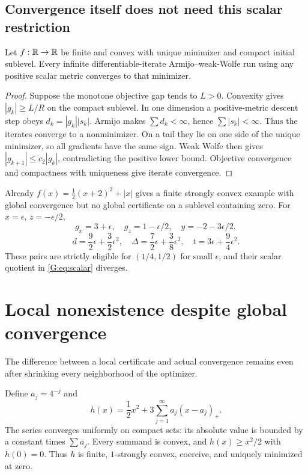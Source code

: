 

\subsection{Convergence itself does not need this scalar restriction}

\begin{proposition}\label{G:prop:scalarconv}
Let $f:\mathbb R\to\mathbb R$ be finite and convex with unique minimizer and compact initial sublevel. Every infinite differentiable-iterate Armijo--weak-Wolfe run using any positive scalar metric converges to that minimizer.
\end{proposition}
\begin{proof}
Suppose the monotone objective gap tends to $L>0$. Convexity gives $|g_k|\ge L/R$ on the compact sublevel. In one dimension a positive-metric descent step obeys $d_k=|g_k||s_k|$. Armijo makes $\sum d_k<\infty$, hence $\sum|s_k|<\infty$. Thus the iterates converge to a nonminimizer. On a tail they lie on one side of the unique minimizer, so all gradients have the same sign. Weak Wolfe then gives $|g_{k+1}|\le c_2|g_k|$, contradicting the positive lower bound. Objective convergence and compactness with uniqueness give iterate convergence.
\end{proof}
Already $f(x)=\frac12(x+2)^2+|x|$ gives a finite strongly convex example with global convergence but no global certificate on a sublevel containing zero. For $x=\epsilon$, $z=-\epsilon/2$,
\[
 g_x=3+\epsilon,\quad g_z=1-\epsilon/2,\quad y=-2-3\epsilon/2,
\]
\[
 d=\frac92\epsilon+\frac32\epsilon^2,\quad
 \Delta=\frac72\epsilon+\frac38\epsilon^2,\quad
 t=3\epsilon+\frac94\epsilon^2.
\]
These pairs are strictly eligible for $(1/4,1/2)$ for small $\epsilon$, and their scalar quotient in \eqref{G:eq:scalar} diverges.


\setcounter{section}{6}
\setcounter{theorem}{0}
\setcounter{equation}{6}


\section{Local nonexistence despite global convergence}
The difference between a local certificate and actual convergence remains even after shrinking every neighborhood of the optimizer.

Define $a_j=4^{-j}$ and
\begin{equation}
 h(x)=\frac12x^2+3\sum_{j=1}^\infty a_j(x-a_j)_+. \label{G:eq:infinite}
\end{equation}
The series converges uniformly on compact sets: its absolute value is bounded by a constant times $\sum a_j$. Every summand is convex, and $h(x)\ge x^2/2$ with $h(0)=0$. Thus $h$ is finite, $1$-strongly convex, coercive, and uniquely minimized at zero.

